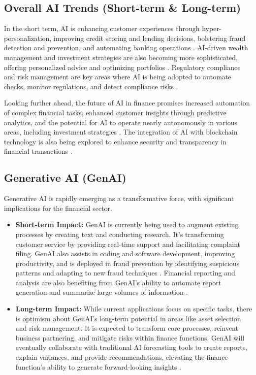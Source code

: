 \subsection{Overall AI Trends (Short-term \& Long-term)}
In the short term, AI is enhancing customer experiences through hyper-personalization, improving credit scoring and lending decisions, bolstering fraud detection and prevention, and automating banking operations \cite{Uptiq_FutureTrends, HashStudioz_FutureTrends}. AI-driven wealth management and investment strategies are also becoming more sophisticated, offering personalized advice and optimizing portfolios \cite{Uptiq_FutureTrends}. Regulatory compliance and risk management are key areas where AI is being adopted to automate checks, monitor regulations, and detect compliance risks \cite{Uptiq_FutureTrends, Northwest_FutureTrends}.

Looking further ahead, the future of AI in finance promises increased automation of complex financial tasks, enhanced customer insights through predictive analytics, and the potential for AI to operate nearly autonomously in various areas, including investment strategies \cite{BluePrism_FutureTrends}. The integration of AI with blockchain technology is also being explored to enhance security and transparency in financial transactions \cite{Uptiq_FutureTrends}.

\subsection{Generative AI (GenAI)}
Generative AI is rapidly emerging as a transformative force, with significant implications for the financial sector.
\begin{itemize}
    \item \textbf{Short-term Impact:} GenAI is currently being used to augment existing processes by creating text and conducting research. It's transforming customer service by providing real-time support and facilitating complaint filing. GenAI also assists in coding and software development, improving productivity, and is deployed in fraud prevention by identifying suspicious patterns and adapting to new fraud techniques \cite{ThreeBoxSolution_GenAI, WeAreCommunity_GenAI}. Financial reporting and analysis are also benefiting from GenAI's ability to automate report generation and summarize large volumes of information \cite{AlphaSense_GenAI}.
    \item \textbf{Long-term Impact:} While current applications focus on specific tasks, there is optimism about GenAI's long-term potential in areas like asset selection and risk management. It is expected to transform core processes, reinvent business partnering, and mitigate risks within finance functions. GenAI will eventually collaborate with traditional AI forecasting tools to create reports, explain variances, and provide recommendations, elevating the finance function's ability to generate forward-looking insights \cite{BCG_GenAI}.
\end{itemize}

